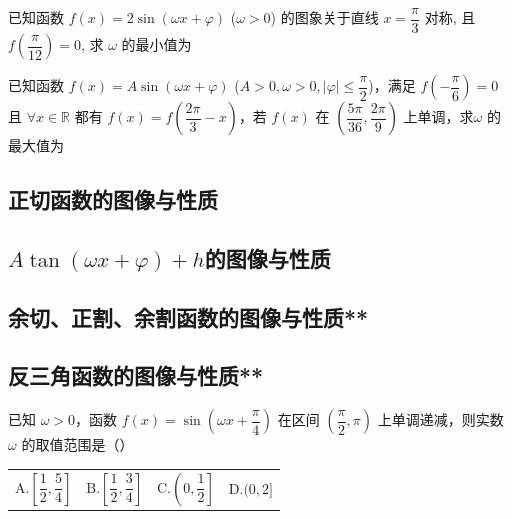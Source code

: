 \begin{example}
已知函数 \( f(x) = 2\sin(\omega x + \varphi) \) (\(\omega > 0\)) 的图象关于直线 \( x = \dfrac{\pi}{3} \) 对称, 且 \( f\left(\dfrac{\pi}{12}\right) = 0 \), 求 \(\omega\) 的最小值为

\end{example}
\begin{exercise}
已知函数 \( f(x) = A\sin(\omega x + \varphi) \) (\(A > 0, \omega > 0, |\varphi| \leq \dfrac{\pi}{2}\))，满足 \( f\left(-\dfrac{\pi}{6}\right) = 0 \) 且 \(\forall x \in \mathbb{R} \) 都有 \( f(x) = f\left(\dfrac{2\pi}{3} - x\right) \)，若 \( f(x) \) 在 \( \left(\dfrac{5\pi}{36}, \dfrac{2\pi}{9}\right) \) 上单调，求\(\omega\) 的最大值为
\end{exercise}






















\clearpage
\subsection{正切函数的图像与性质}
\clearpage
\subsection{\texorpdfstring{$A\tan(\omega x+\varphi)+h$}s的图像与性质}
\clearpage
\subsection{余切、正割、余割函数的图像与性质**}
\clearpage
\subsection{反三角函数的图像与性质**}
\clearpage
\review





\clearpage
\hw
\begin{homework}[2012年新课标卷]
    已知 \(\omega > 0\)，函数 \( f(x) = \sin(\omega x + \dfrac{\pi}{4}) \) 在区间 \((\dfrac{\pi}{2}, \pi)\) 上单调递减，则实数 \(\omega\) 的取值范围是（\quad  ）

\begin{table}[H]
    \centering
\begin{tabular*}{\hsize}{@{}@{\extracolsep{\fill}}llll@{}}
   \(\text{A.}  \left[\dfrac{1}{2}, \dfrac{5}{4}\right] \)  & \( \text{B.}  \left[\dfrac{1}{2}, \dfrac{3}{4}\right] \) & \(    \text{C.} \left(0, \dfrac{1}{2}\right] \) & $\text{D.}  (0, 2]$
\end{tabular*}
\end{table}

\end{homework}


